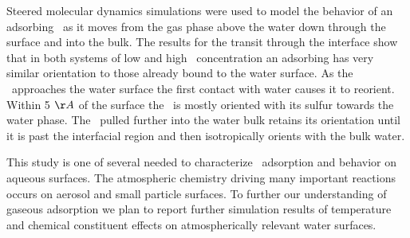 Steered molecular dynamics simulations were used to model the behavior of an adsorbing \suldiox~as it moves from the gas phase above the water down through the surface and into the bulk. The results for the transit through the interface show that in both systems of low and high \suldiox~concentration an adsorbing \suldiox has very similar orientation to those already bound to the water surface. As the \suldiox~approaches the water surface the first contact with water causes it to reorient. Within 5 $\AA$ of the surface the \suldiox~is mostly oriented with its sulfur towards the water phase. The \suldiox~pulled further into the water bulk retains its orientation until it is past the interfacial region and then isotropically orients with the bulk water.

This study is one of several needed to characterize \suldiox~adsorption and behavior on aqueous surfaces. The atmospheric chemistry driving many important reactions occurs on aerosol and small particle surfaces. To further our understanding of gaseous adsorption we plan to report further simulation results of temperature and chemical constituent effects on atmospherically relevant water surfaces.
